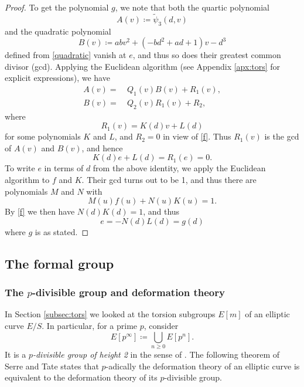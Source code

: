 \documentclass{gtpart}
\theoremstyle{definition}
\theoremstyle{remark}
\newcommand{\Tp}{\widetilde{\psi}}
\newcommand{\ce}{\coloneqq}
\numberwithin{equation}{section}
\numberwithin{thm}{section}
\begin{document}
\begin{proof}
 To get the polynomial $g$, we note that both the quartic polynomial 
 \[
  A(v) \ce \Tp_3(d,v) 
 \]
 and the quadratic polynomial 
 \[
  B(v) \ce a b v^2 + (-b d^2 + a d + 1) v - d^3 
 \]
 defined from \eqref{quadratic} vanish at $e$, and thus so does their 
 greatest common divisor (gcd).  Applying the Euclidean algorithm (see 
 Appendix \ref{apx:tors} for explicit expressions), we have 
 \begin{equation*}
 \begin{split}
  A(v) = & ~ Q_1(v) B(v) + R_1(v), \\
  B(v) = & ~ Q_2(v) R_1(v) + R_2, 
 \end{split}
 \end{equation*}
 where 
 \[
  R_1(v) = K(d) v + L(d) 
 \]
 for some polynomials $K$ and $L$, and $R_2 = 0$ in view of \eqref{f}.  
 Thus $R_1(v)$ is the gcd of $A(v)$ and $B(v)$, and hence 
 \[
  K(d) e + L(d) = R_1(e) = 0.  
 \]
 To write $e$ in terms of $d$ from the above identity, we apply the 
 Euclidean algorithm to $f$ and $K$.  Their gcd turns out to be 1, and 
 thus there are polynomials $M$ and $N$ with 
 \[
  M(u) f(u) + N(u) K(u) = 1.  
 \]
 By \eqref{f} we then have $N(d) K(d) = 1$, and thus 
 \[
  e = -N(d) L(d) = g(d) 
 \]
 where $g$ is as stated.  
\end{proof}


\subsection{The formal group}
\label{subsec:fg}

\subsubsection*{The $p$-divisible group and deformation theory}

In Section \ref{subsec:tors} we looked at the torsion subgroups $E[m]$ 
of an elliptic curve $E/S$.  In particular, for a prime $p$, consider 
\[
 E[p^\infty] \ce \bigcup_{n \geq 0} E[p^n].  
\]
It is a {\em $p$-divisible group of height 2} in the sense of 
\cite[Section 2.1]{tate}.  The following theorem of Serre and Tate 
states that $p$-adically the deformation theory of an elliptic curve is 
equivalent to the deformation theory of its $p$-divisible group.  
\end{document}
